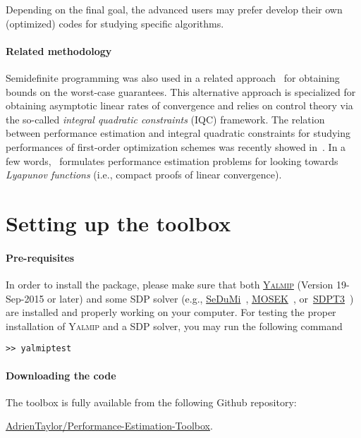\documentclass[11pt,a4paper]{article}
\begin{document}
Depending on the final goal, the advanced users may prefer develop their own (optimized) codes for studying specific algorithms.
\paragraph{Related methodology} Semidefinite programming was also used in a related approach~\cite{lessard2014analysis} for obtaining bounds on the worst-case guarantees. This alternative approach is specialized for obtaining asymptotic linear rates of convergence and relies on control theory via the so-called \emph{integral quadratic constraints} (IQC) framework. The relation between performance estimation and integral quadratic constraints for studying performances of first-order optimization schemes was recently showed in~\cite{taylor2018lyapunov}. In a few words,~\cite{taylor2018lyapunov} formulates performance estimation problems for looking towards \emph{Lyapunov functions} (i.e., compact proofs of linear convergence).

\clearpage
\section{Setting up the toolbox}		%


\paragraph{Pre-requisites} In order to install the package, please make sure that both \href{https://yalmip.github.io/}{\textsc{Yalmip}} (Version 19-Sep-2015 or later) and some SDP solver (e.g., \href{http://sedumi.ie.lehigh.edu/}{SeDuMi}~\cite{Article:Sedumi}, \href{https://mosek.com/}{MOSEK}~\cite{Article:Mosek}, or~\href{http://www.math.nus.edu.sg/~mattohkc/sdpt3.html}{SDPT3}~\cite{Article:sdpt3}) are installed and properly working on your computer. For testing the proper installation of \textsc{Yalmip} and a SDP solver, you may run the following command
\begin{verbatim}
>> yalmiptest
\end{verbatim}
\paragraph{Downloading the code} The toolbox is fully available from the following {\sc Github} repository: \begin{center}
\href{https://github.com/AdrienTaylor/Performance-Estimation-Toolbox}{\sc AdrienTaylor/Performance-Estimation-Toolbox}.\\
\end{center}
\end{document}
